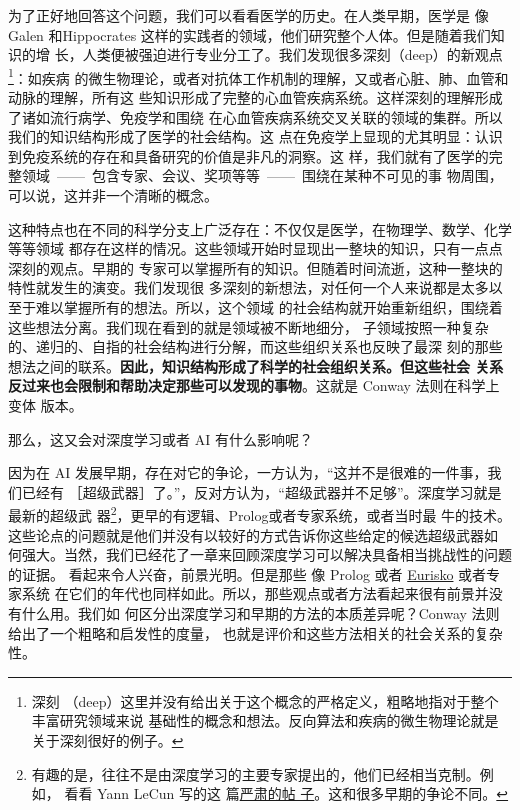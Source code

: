 为了正好地回答这个问题，我们可以看看医学的历史。在人类早期，医学是
像 Galen 和Hippocrates 这样的实践者的领域，他们研究整个人体。但是随着我们知识的增
长，人类便被强迫进行专业分工了。我们发现很多深刻（deep）的新观点\footnote{深刻
  （deep）这里并没有给出关于这个概念的严格定义，粗略地指对于整个丰富研究领域来说
  基础性的概念和想法。反向算法和疾病的微生物理论就是关于深刻很好的例子。}：如疾病
的微生物理论，或者对抗体工作机制的理解，又或者心脏、肺、血管和动脉的理解，所有这
些知识形成了完整的心血管疾病系统。这样深刻的理解形成了诸如流行病学、免疫学和围绕
在心血管疾病系统交叉关联的领域的集群。所以我们的知识结构形成了医学的社会结构。这
点在免疫学上显现的尤其明显：认识到免疫系统的存在和具备研究的价值是非凡的洞察。这
样，我们就有了医学的完整领域~——~包含专家、会议、奖项等等~——~围绕在某种不可见的事
物周围，可以说，这并非一个清晰的概念。

这种特点也在不同的科学分支上广泛存在：不仅仅是医学，在物理学、数学、化学等等领域
都存在这样的情况。这些领域开始时显现出一整块的知识，只有一点点深刻的观点。早期的
专家可以掌握所有的知识。但随着时间流逝，这种一整块的特性就发生的演变。我们发现很
多深刻的新想法，对任何一个人来说都是太多以至于难以掌握所有的想法。所以，这个领域
的社会结构就开始重新组织，围绕着这些想法分离。我们现在看到的就是领域被不断地细分，
子领域按照一种复杂的、递归的、自指的社会结构进行分解，而这些组织关系也反映了最深
刻的那些想法之间的联系。\textbf{因此，知识结构形成了科学的社会组织关系。但这些社会
  关系反过来也会限制和帮助决定那些可以发现的事物}。这就是 Conway 法则在科学上变体
版本。

那么，这又会对深度学习或者 AI 有什么影响呢？

因为在 AI 发展早期，存在对它的争论，一方认为，“这并不是很难的一件事，我们已经有
［超级武器］了。”，反对方认为，“超级武器并不足够”。深度学习就是最新的超级武
器\footnote{有趣的是，往往不是由深度学习的主要专家提出的，他们已经相当克制。例如，
  看看 Yann LeCun 写的这
  篇\href{https://www.facebook.com/yann.lecun/posts/10152348155137143}{严肃的帖
    子}。这和很多早期的争论不同。}，更早的有逻辑、Prolog或者专家系统，或者当时最
牛的技术。这些论点的问题就是他们并没有以较好的方式告诉你这些给定的候选超级武器如
何强大。当然，我们已经花了一章来回顾深度学习可以解决具备相当挑战性的问题的证据。
看起来令人兴奋，前景光明。但是那些
像 Prolog 或者 \href{http://en.wikipedia.org/wiki/Eurisko}{Eurisko} 或者专家系统
在它们的年代也同样如此。所以，那些观点或者方法看起来很有前景并没有什么用。我们如
何区分出深度学习和早期的方法的本质差异呢？Conway 法则给出了一个粗略和启发性的度量，
也就是评价和这些方法相关的社会关系的复杂性。

